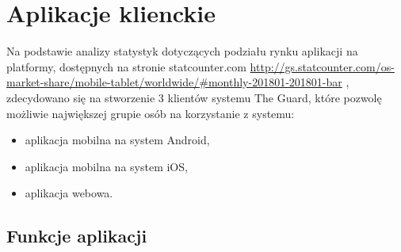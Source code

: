 \chapter{Aplikacje klienckie}

Na podstawie analizy statystyk dotyczących podziału rynku aplikacji na platformy, dostępnych na stronie statcounter.com \url{http://gs.statcounter.com/os-market-share/mobile-tablet/worldwide/#monthly-201801-201801-bar} , zdecydowano się na stworzenie 3 klientów systemu The Guard, które pozwolę możliwie największej grupie osób na korzystanie z systemu:
\begin{itemize}
\item aplikacja mobilna na system Android,
\item aplikacja mobilna na system iOS,
\item aplikacja webowa.
\end{itemize}

\section{Funkcje aplikacji}
